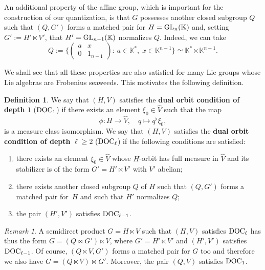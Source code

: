 \documentclass[a4paper,11pt,reqno]{amsart}
\numberwithin{equation}{section}
\theoremstyle{remark}
\newtheorem{remark}[theorem]{Remark}
\theoremstyle{definition}
\newtheorem{definition}[theorem]{Definition}
\newcommand{\K}{\mathbb K}
\begin{document}
An additional property of the affine group, which is important for the construction of our quantization,
is that $G$ possesses another closed subgroup $Q$ such that $(Q,G')$ forms   a matched pair
for $H={\rm GL}_n(\K)$ and, setting $G':=H'\ltimes V'$, that $H'={\rm GL}_{n-1}(\K)$ normalizes $Q$. Indeed, we can take
 $$
  Q:=\bigg\{\begin{pmatrix}a&x\\0&1_{n-1}\end{pmatrix}:\ a\in\K^*,\; x\in \K^{n-1}\bigg\}\simeq \K^*\ltimes \K^{n-1}.
  $$

We shall see that all these properties are also satisfied for many Lie groups whose Lie algebras are Frobenius seaweeds.
This motivates the following definition.







\begin{definition}
\label{DOCn}
We say that $(H,V)$  satisfies the {\bf dual orbit condition of depth $1$} (${\rm DOC}_1$) if
there exists an element $\xi_0\in\hat V$ such that the map
\begin{equation}
\label{Phi0}
\phi:H\to\hat V,\quad q\mapsto q^\flat\xi_0,
\end{equation}
is a measure class isomorphism.
We say that $(H,V)$  satisfies the {\bf dual orbit condition of depth} $\ell\geq 2$ (${\rm DOC}_\ell$) if
the following conditions are satisfied:
\begin{enumerate}
\item there exists an element $\xi_0\in\hat V$ whose $H$-orbit has full measure in $\hat V$ and its
 stabilizer  is of the form $G'=H'\ltimes V'$ with $V'$ abelian;
\item  there exists  another closed subgroup $Q$ of $H$ such that $(Q, G')$ forms a matched pair for~$H$
 and  such that  $H'$ normalizes $Q$;
\item the pair $(H',V')$ satisfies ${\rm DOC}_{\ell-1}$.
\end{enumerate}
  \end{definition}


\begin{remark}
A semidirect product  $G=H\ltimes V$ such that $(H,V)$ satisfies ${\rm DOC}_\ell$
has thus the form $G=(Q\bowtie G')\ltimes V$,
  where $G'=H'\ltimes V'$  and $(H',V')$ satisfies  ${\rm DOC}_{\ell-1}$.
  Of course, $(Q\ltimes V,G')$ forms a matched pair for $G$ too and therefore we also have $G=(Q\ltimes V)\bowtie G'$. Moreover,
the pair $(Q,V)$ satisfies ${\rm DOC}_1$.
  \end{remark}
\end{document}
